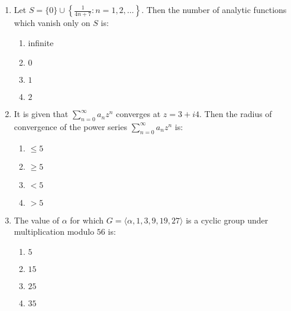 \documentclass[journal]{IEEEtran}
\numberwithin{equation}{enumi}
\numberwithin{figure}{enumi}
\begin{document}
\begin{enumerate}
and let $V = \{(x, y, z) \in \mathbb{R}^3 : \det(A) = 0\}$. Then the dimension of $V$ equals:

\begin{multicols}{4}
\begin{enumerate}
    \item $0$
    \item $1$
    \item $2$
    \item $3$
\end{enumerate}
\end{multicols}


 
\item Let $S = \{0\} \cup \left\{ \frac{1}{4n + 7} : n = 1, 2, \ldots \right\}$. Then the number of analytic functions which vanish only on $S$ is:    \hfill{}
\begin{multicols}{4}
\begin{enumerate}
    \item infinite
    \item $0$
    \item $1$
    \item $2$
\end{enumerate}
\end{multicols}
 

\item It is given that $\sum_{n=0}^\infty a_n z^n$ converges at $z = 3 + i4$. Then the radius of convergence of the power series $\sum_{n=0}^\infty a_n z^n$ is:   \hfill{}
\begin{multicols}{4}
\begin{enumerate}
    \item $\leq 5 $
    \item $\geq 5$
    \item $< 5$
    \item $> 5$
\end{enumerate}
\end{multicols}


\item The value of $\alpha$ for which $G = \langle \alpha, 1, 3, 9, 19, 27 \rangle$ is a cyclic group under multiplication modulo $56$ is:      \hfill{}
\begin{multicols}{4}
\begin{enumerate}
    \item $5 $
    \item $15$
    \item $25$
    \item $35$
\end{enumerate}
\end{multicols}




\end{enumerate}
\end{document}
